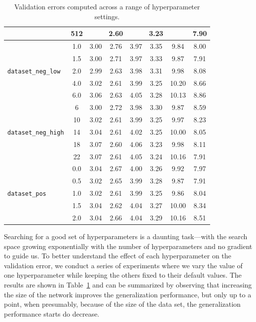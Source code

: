 \documentclass[twoside,11pt]{article}
\begin{document}
\begin{table}[p]
\begin{center}
\begin{tabular}{lc ccc ccc}
& 512 & & 2.60 & & 3.23 & & 7.90 \\\midrule
\multirow{5}{*}{\texttt{dataset\_neg\_low}}
& 1.0 & 3.00 & 2.76 & 3.97 & 3.35 & 9.84 & 8.00 \\
& 1.5 & 3.00 & 2.71 & 3.97 & 3.33 & 9.87 & 7.91 \\
& 2.0 & 2.99 & 2.63 & 3.98 & 3.31 & 9.98 & 8.08 \\
& 4.0 & 3.02 & 2.61 & 3.99 & 3.25 & 10.20 & 8.66 \\
& 6.0 & 3.06 & 2.63 & 4.05 & 3.28 & 10.13 & 8.86 \\\midrule
\multirow{5}{*}{\texttt{dataset\_neg\_high}}
& 6 & 3.00 & 2.72 & 3.98 & 3.30 & 9.87 & 8.59 \\
& 10 & 3.02 & 2.61 & 3.99 & 3.25 & 9.97 & 8.23 \\
& 14 & 3.04 & 2.61 & 4.02 & 3.25 & 10.00 & 8.05 \\
& 18 & 3.07 & 2.60 & 4.06 & 3.23 & 9.98 & 8.11 \\
& 22 & 3.07 & 2.61 & 4.05 & 3.24 & 10.16 & 7.91 \\\midrule
\multirow{5}{*}{\texttt{dataset\_pos}}
& 0.0 & 3.04 & 2.67 & 4.00 & 3.26 & 9.92 & 7.97 \\
& 0.5 & 3.02 & 2.65 & 3.99 & 3.28 & 9.87 & 7.91 \\
& 1.0 & 3.02 & 2.61 & 3.99 & 3.25 & 9.86 & 8.04 \\
& 1.5 & 3.04 & 2.62 & 4.04 & 3.27 & 10.00 & 8.34 \\
& 2.0 & 3.04 & 2.66 & 4.04 & 3.29 & 10.16 & 8.51 \\\bottomrule
\end{tabular}
\caption{Validation errors computed across a range of hyperparameter settings.}

\label{tbl:hyperparameters}
\end{center}
\end{table}

Searching for a good set of hyperparameters is a daunting task---with the
search space growing exponentially with the number of hyperparameters and no
gradient to guide us. To better understand the effect of each hyperparameter on
the validation error, we conduct a series of experiments where we vary the
value of one hyperparameter while keeping the others fixed to their
default values. The results are shown in Table~\ref{tbl:hyperparameters} and
can be summarized by observing that increasing the size of the network improves
the generalization performance, but only up to a point, when presumably,
because of the size of the data set, the generalization performance starts do
decrease.  
\end{document}
